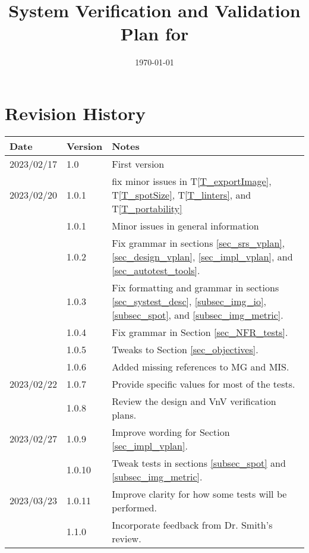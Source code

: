 \documentclass[12pt, titlepage]{article}
\begin{document}
\title{System Verification and Validation Plan for \progname{}} 
\author{\authname}
\date{\today}
	
\maketitle


\section{Revision History}

\begin{tabularx}{\textwidth}{p{2.2cm}p{1.8cm}X}
\toprule {\bf Date} & {\bf Version} & {\bf Notes}\\
\midrule
2023/02/17 & 1.0 & First version \\
2023/02/20 & 1.0.1 & fix minor issues in T\ref{T_exportImage}, T\ref{T_spotSize}, T\ref{T_linters}, 
  and T\ref{T_portability}\\
  & 1.0.1 & Minor issues in general information\\
  & 1.0.2 & Fix grammar in sections \ref{sec_srs_vplan}, 
  \ref{sec_design_vplan}, \ref{sec_impl_vplan}, and \ref{sec_autotest_tools}. \\
  & 1.0.3 & Fix formatting and grammar in sections \ref{sec_systest_desc}, 
  \ref{subsec_img_io}, \ref{subsec_spot}, and \ref{subsec_img_metric}. \\
  & 1.0.4 & Fix grammar in Section \ref{sec_NFR_tests}. \\
  & 1.0.5 & Tweaks to Section \ref{sec_objectives}. \\
  & 1.0.6 & Added missing references to MG and MIS. \\
2023/02/22 & 1.0.7 & Provide specific values for most of the tests. \\
  & 1.0.8 & Review the design and VnV verification plans. \\
2023/02/27 & 1.0.9 & Improve wording for Section \ref{sec_impl_vplan}. \\
  & 1.0.10 & Tweak tests in sections \ref{subsec_spot} and \ref{subsec_img_metric}. \\
2023/03/23 & 1.0.11 & Improve clarity for how some tests will be performed.\\
  & 1.1.0 & Incorporate feedback from Dr. Smith's review.\\
\bottomrule
\end{tabularx}
\end{document}

